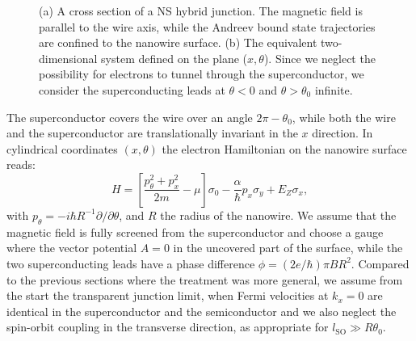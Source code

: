 \begin{figure}
\begin{center}
\caption{(a) A cross section of a NS hybrid junction.
The magnetic field is parallel to the wire axis, while the Andreev bound state trajectories are confined to the nanowire surface.
(b) The equivalent two-dimensional system defined on the plane ($x,\theta$).
Since we neglect the possibility for electrons to tunnel through the superconductor, we consider the superconducting leads at $\theta<0$ and $\theta>\theta_0$ infinite.
\label{fig:orb}
}
\end{center}
\end{figure}

The superconductor covers the wire over an angle $2\pi-\theta_0$, while both the wire and the superconductor are translationally invariant in the $x$ direction.
In cylindrical coordinates $(x, \theta)$ the electron Hamiltonian on the nanowire surface reads:
\begin{equation}
H=\left[\frac{p_\theta^2 + p_x^2}{2m}
-\mu\right]\sigma_0-\frac{\alpha}{\hbar}p_x\sigma_y
+E_Z\sigma_x,
\end{equation}
with $p_\theta = -i\hbar R^{-1}\partial/\partial \theta$, and $R$ the radius of the nanowire.
We assume that the magnetic field is fully screened from the superconductor and choose a gauge where the vector potential $A=0$ in the uncovered part of the surface, while the two superconducting leads have a phase difference $\phi = (2 e/\hbar) \pi B R^2$.
Compared to the previous sections where the treatment was more general, we assume from the start the transparent junction limit, when Fermi velocities at $k_x=0$ are identical in the superconductor and the semiconductor and we also neglect the spin-orbit coupling in the transverse direction, as appropriate for $l_\textrm{SO} \gg R \theta_0$.

